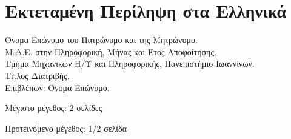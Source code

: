\chapter*{Εκτεταμένη Περίληψη στα Ελληνικά}

Όνομα Επώνυμο του Πατρώνυμο και της Μητρώνυμο.\\
Μ.Δ.Ε. στην Πληροφορική, Μήνας και Έτος Αποφοίτησης.\\
Τμήμα Μηχανικών Η/Υ και Πληροφορικής, Πανεπιστήμιο Ιωαννίνων.\\
Τίτλος Διατριβής.\\
Επιβλέπων: Όνομα Επώνυμο.\\
\bigskip

\y\noindent Μέγιστο μέγεθος: 2 σελίδες

\y\noindent Προτεινόμενο μέγεθος: 1/2 σελίδα
